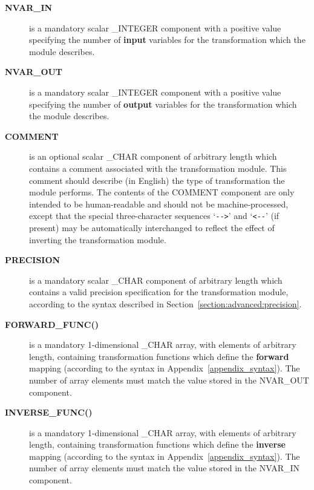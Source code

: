 \documentclass[twoside,nolof,11pt]{starlink}
\providecommand{\name}[1]{\small{#1}}
\begin{document}
\begin{description}

\item[\textbf{\name{NVAR\_IN}}] is a mandatory scalar \name{\_INTEGER}
component with a positive value specifying the number of \textbf{input}
variables for the transformation which the module describes.

\item[\textbf{\name{NVAR\_OUT}}] is a mandatory scalar \name{\_INTEGER}
component with a positive value specifying the number of \textbf{output}
variables for the transformation which the module describes.

\item[\textbf{\name{COMMENT}}] is an optional scalar \name{\_CHAR} component of
arbitrary length which contains a comment associated with the transformation
module.
This comment should describe (in English) the type of transformation the
module performs.
The contents of the \name{COMMENT} component are only intended to be
human-readable and should not be machine-processed, except that the special
three-character sequences `\verb#-->#' and `\verb#<--#' (if present) may be
automatically interchanged to reflect the effect of inverting the
transformation module.

\item[\textbf{\name{PRECISION}}] is a mandatory scalar \name{\_CHAR} component
of arbitrary length which contains a valid precision specification for the
transformation module, according to the syntax described in
Section~\ref{section:advanced:precision}.

\item[\textbf{\name{FORWARD\_FUNC()}}] is a mandatory 1-dimensional
\name{\_CHAR} array, with elements of arbitrary length, containing
transformation functions which define the \textbf{forward} mapping (according
to the syntax in Appendix~\ref{appendix_syntax}).
The number of array elements must match the value stored in the \name{NVAR\_OUT}
component.

\item[\textbf{\name{INVERSE\_FUNC()}}] is a mandatory 1-dimensional
\name{\_CHAR} array, with elements of arbitrary length, containing
transformation functions which define the \textbf{inverse} mapping
(according to the syntax in Appendix~\ref{appendix_syntax}).
The number of array elements must match the value stored in the
\name{NVAR\_IN} component.

\end{description}
\end{document}
